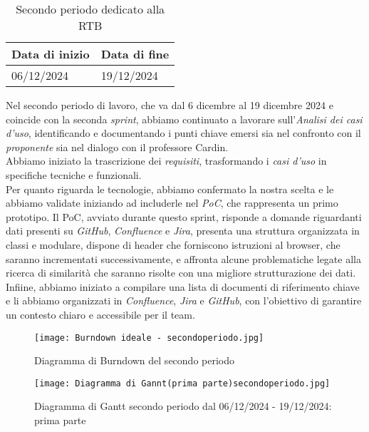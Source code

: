\newpage
{}
\label{sec:secondo periodo}
\begin{table}[h!]
    \centering
    \renewcommand{\arraystretch}{1.5} %
    \begin{tabularx}{\textwidth}{|X|X|}\hline
    \rowcolor[HTML]{FFD700} 
    \textbf{Data di inizio} & \textbf{Data di fine} \\ \hline
    06/12/2024 & 19/12/2024 \\ \hline
    \end{tabularx}
    \caption{Secondo periodo dedicato alla RTB}
\end{table}
Nel secondo periodo di lavoro, che va dal 6 dicembre al 19 dicembre 2024 e coincide con la seconda \textit{sprint}, abbiamo continuato a lavorare sull’\emph{Analisi dei casi d’uso}, identificando e documentando i punti chiave emersi sia nel confronto con il \emph{proponente} sia nel dialogo con il professore Cardin.\\
Abbiamo iniziato la trascrizione dei \emph{requisiti}, trasformando i \emph{casi d’uso} in specifiche tecniche e funzionali.\\
Per quanto riguarda le tecnologie, abbiamo confermato la nostra scelta e le abbiamo validate iniziando ad includerle nel \emph{PoC}, che rappresenta un primo prototipo. Il PoC, avviato durante questo sprint, risponde a domande riguardanti dati presenti su \emph{GitHub}, \emph{Confluence} e \emph{Jira}, presenta una struttura organizzata in classi e modulare, dispone di header che forniscono istruzioni al browser, che saranno incrementati successivamente, e affronta alcune problematiche legate alla ricerca di similarità che saranno risolte con una migliore strutturazione dei dati. \\
Infiine, abbiamo iniziato a compilare una lista di documenti di riferimento chiave e li abbiamo organizzati in \emph{Confluence}, \emph{Jira} e \emph{GitHub}, con l’obiettivo di garantire un contesto chiaro e accessibile per il team.

\newpage

\begin{figure}[h] 
    \centering
    \texttt{[image: Burndown ideale - secondoperiodo.jpg]}
    \caption{Diagramma di Burndown del secondo periodo} 
    \label{fig: Diagramma di Burndown del secondo periodo}
\end{figure}

\newpage

\begin{figure}[h] 
    \centering
    \texttt{[image: Diagramma di Gannt(prima parte)secondoperiodo.jpg]}
    \caption{Diagramma di Gantt secondo periodo dal 06/12/2024 - 19/12/2024: prima parte} 
    \label{fig: Diagramma di Gantt primo periodo dal 06/12/2024 - 19/12/2024: prima parte}
\end{figure}

